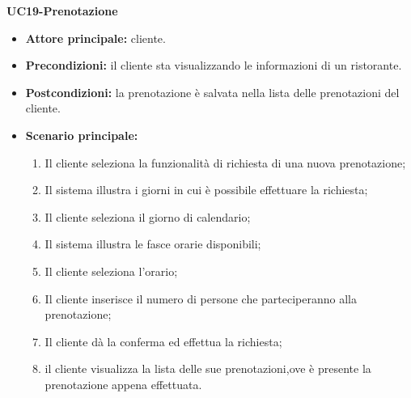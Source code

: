 \textbf{UC19-Prenotazione}
\begin{itemize}
    \item \textbf{Attore principale: }cliente.
    \item \textbf{Precondizioni: }il cliente sta visualizzando le informazioni di un ristorante.
    \item \textbf{Postcondizioni: }la prenotazione è salvata nella lista delle prenotazioni del cliente.
    \item \textbf{Scenario principale:} 
        \begin{enumerate}
            \item Il cliente seleziona la funzionalità di richiesta di una nuova prenotazione;
            \item Il sistema illustra i giorni in cui è possibile effettuare la richiesta;
            \item Il cliente seleziona il giorno di calendario;
            \item Il sistema illustra le fasce orarie disponibili;
            \item Il cliente seleziona l'orario;
            \item Il cliente inserisce il numero di persone che parteciperanno alla prenotazione;
            \item Il cliente dà la conferma ed effettua la richiesta;
            \item il cliente visualizza la lista delle sue prenotazioni,ove è presente la prenotazione appena
            effettuata.
        \end{enumerate}
\end{itemize}
